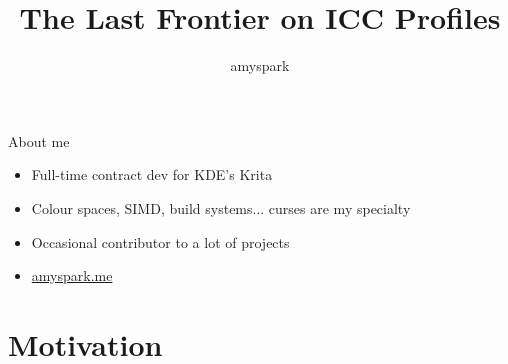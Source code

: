 \documentclass[final, aspectratio=169]{divoc}
\title{The Last Frontier on ICC Profiles}
\author{amyspark}
\date{\DTMdate{2022-04-15}}
\begin{document}
\maketitle

\begin{frame}{About me}
  \begin{itemize}[<*>]
    \item Full-time contract dev for KDE's Krita
    \item Colour spaces, SIMD, build systems... curses are my specialty 
    \item Occasional contributor to a lot of projects
    \item \href{https://www.amyspark.me}{amyspark.me}
  \end{itemize}
\end{frame}
\section*{Motivation}
\end{document}
